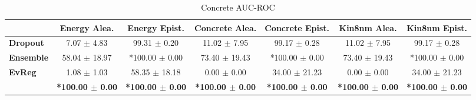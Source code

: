 \begin{table*}[ht]
    \caption{Concrete AUC-ROC}
    \centering
    \scriptsize
    \begin{tabular}{lcccccc}
        \toprule
        & \textbf{Energy Alea.} & \textbf{Energy Epist.} & \textbf{Concrete Alea.} & \textbf{Concrete Epist.} & \textbf{Kin8nm Alea.} & \textbf{Kin8nm Epist.} \\
        \midrule
        \textbf{Dropout} & 7.07 $\pm$ 4.83 & 99.31 $\pm$ 0.20 & 11.02 $\pm$ 7.95 & 99.17 $\pm$ 0.28 & 11.02 $\pm$ 7.95 & 99.17 $\pm$ 0.28 \\
        \textbf{Ensemble} & 58.04 $\pm$ 18.97 & *100.00 $\pm$ 0.00 & 73.40 $\pm$ 19.43 & *100.00 $\pm$ 0.00 & 73.40 $\pm$ 19.43 & *100.00 $\pm$ 0.00 \\
        \midrule
        \textbf{EvReg} & 1.08 $\pm$ 1.03 & 58.35 $\pm$ 18.18 & 0.00 $\pm$ 0.00 & 34.00 $\pm$ 21.23 & 0.00 $\pm$ 0.00 & 34.00 $\pm$ 21.23 \\
        \textbf{\oursacro{}} & \textbf{*100.00 $\pm$ 0.00} & \textbf{*100.00 $\pm$ 0.00} & \textbf{*100.00 $\pm$ 0.00} & \textbf{*100.00 $\pm$ 0.00} & \textbf{*100.00 $\pm$ 0.00} & \textbf{*100.00 $\pm$ 0.00} \\
        \bottomrule
    \end{tabular}
\end{table*}